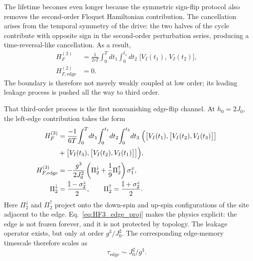 \documentclass[aps,prb,reprint,twocolumn,amsmath,amssymb,citeautoscript]{revtex4-2}
\begin{document}
The lifetime becomes even longer because the symmetric sign-flip protocol also removes the second-order Floquet Hamiltonian contribution. The cancellation arises from the temporal symmetry of the drive: the two halves of the cycle contribute with opposite sign in the second-order perturbation series, producing a time-reversal-like cancellation. As a result,
\begin{equation}
\begin{aligned}
    H_F^{(2)}
&=\frac{1}{2iT}\int_0^T\!dt_1\int_0^{t_1}\!dt_2\;
\bigl[V_I(t_1),\,V_I(t_2)\bigr],\\
H_{F,\mathrm{edge}}^{(2)}&=0.
\end{aligned}
\label{eq:HF2_zero}
\end{equation}
The boundary is therefore not merely weakly coupled at low order; its leading leakage process is pushed all the way to third order.

That third-order process is the first nonvanishing edge-flip channel. At $h_0=2J_0$, the left-edge contribution takes the form
\begin{equation}
\begin{aligned}
H_F^{(3)}
&=\frac{-1}{6T}\!\int_0^T\!dt_1\!\int_0^{t_1}\!dt_2
\!\int_0^{t_2}\!dt_3\;\Bigl(
\bigl[V_I(t_1),\bigl[V_I(t_2),V_I(t_3)\bigr]\bigr]
\\ &+\bigl[V_I(t_3),\bigl[V_I(t_2),V_I(t_1)\bigr]\bigr]
\Bigr),\\
H_{F,\mathrm{edge}}^{(3)}
&=
-\frac{g^3}{2J_0^2}
\left(
\Pi_2^{\downarrow}
+\frac{1}{9}\Pi_2^{\uparrow}
\right)\sigma_1^x,\\
\Pi_2^{\downarrow}&=\frac{\mathbb{I}-\sigma_2^z}{2},
\qquad
\Pi_2^{\uparrow}=\frac{\mathbb{I}+\sigma_2^z}{2}.
\end{aligned}
\label{eq:HF3_edge_proj}
\end{equation}
Here $\Pi_2^{\downarrow}$ and $\Pi_2^{\uparrow}$ project onto the down-spin and up-spin configurations of the site adjacent to the edge. Eq.~\eqref{eq:HF3_edge_proj} makes the physics explicit: the edge is not frozen forever, and it is not protected by topology. The leakage operator exists, but only at order $g^3/J_0^2$. The corresponding edge-memory timescale therefore scales as \begin{equation}
    \tau_{\mathrm{edge}}\sim J_0^2/g^3.
    \label{eq:tau_edge}
\end{equation}
\end{document}
